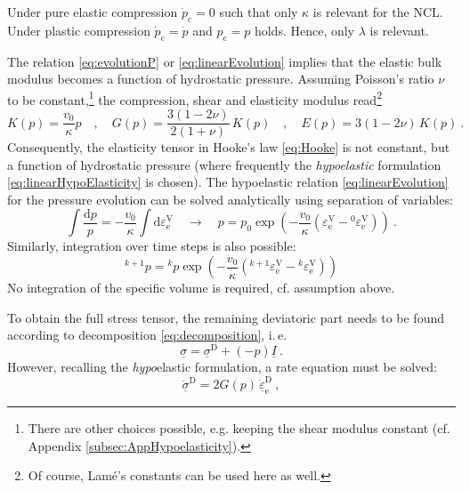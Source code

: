 \documentclass[paper=a4, twoside, pagesize]{scrartcl}
\newcommand{\tensor}[1]{\underline{#1}}
\newcommand{\D}{\text{D}}
\renewcommand{\c}{\text{c}}
\renewcommand{\d}{\text{d}}
\newcommand{\e}{\text{e}}
\newcommand{\minus}{-}
\begin{document}
Under pure elastic compression $\dot{p}_\c = 0$ such that only $\kappa$ is relevant for the NCL. Under plastic compression $\dot{p}_\c = \dot{p}$ and $p_\c = p$ holds. Hence, only $\lambda$ is relevant. 
\par
The relation \eqref{eq:evolutionP} or \eqref{eq:linearEvolution} implies that the elastic bulk modulus becomes a function of hydrostatic pressure. Assuming Poisson's ratio $\nu$ to be constant,\footnote{There are other choices possible, e.g. keeping the shear modulus constant (cf. Appendix \ref{subsec:AppHypoelasticity}).} the compression, shear and elasticity modulus read\footnote{Of course, Lam\'{e}'s constants can be used here as well.}
\begin{equation}\label{eq:elasticParameters}
  K(p) = \frac{v_0}{\kappa}p 
  \quad,\quad
  G(p) =\frac{3(1-2\nu)}{2(1+\nu)}\,K(p) 
  \quad,\quad
  E(p) = 3(1-2\nu)\,K(p)
  \ .
\end{equation}
Consequently, the elasticity tensor in Hooke's law \eqref{eq:Hooke} is not constant, but a function of hydrostatic pressure (where frequently the \emph{hypoelastic} formulation \eqref{eq:linearHypoElasticity} is chosen). The hypoelastic relation \eqref{eq:linearEvolution} for the pressure evolution can be solved analytically using separation of variables:
\begin{equation}
  \int\frac{\d p}{p} = - \frac{v_0}{\kappa}\int\d \varepsilon_\e^\text{V} \quad\rightarrow\quad p = p_0 \exp\left(\minus\frac{v_0}{\kappa}\left(\varepsilon_\e^\text{V}-{}^0\varepsilon_\e^\text{V}\right)\right)  \ .
\end{equation}
Similarly, integration over time steps is also possible:
\begin{equation}\label{eq:pIncrementalIntegration}
    {}^{k+1}p = {}^k p \exp\left(\minus\frac{v_0}{\kappa}\left({}^{k+1}\varepsilon_\e^\text{V}-{}^k\varepsilon_\e^\text{V}\right)\right) 
\end{equation}
No integration of the specific volume is required, cf. assumption above.
\par\noindent
To obtain the full stress tensor, the remaining deviatoric part needs to be found according to decomposition \eqref{eq:decomposition}, i.\,e.
\begin{equation}
  \tensor\sigma = \tensor\sigma^\D + (\minus p) \tensor I \ .    
\end{equation}
However, recalling the \emph{hypo}elastic formulation, a rate equation must be solved:
\begin{equation}
  \dot{\tensor\sigma}^\D = 2G(p)\,\dot{\tensor\varepsilon}_\e^\D \ ,  
\end{equation}
\end{document}
